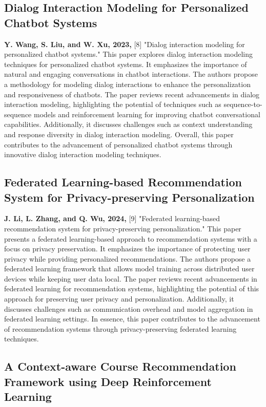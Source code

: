 \subsection{Dialog Interaction Modeling for Personalized Chatbot Systems}

\textbf{Y. Wang, S. Liu, and W. Xu, 2023,} [8] "Dialog interaction modeling for personalized chatbot systems." This paper explores dialog interaction modeling techniques for personalized chatbot systems. It emphasizes the importance of natural and engaging conversations in chatbot interactions. The authors propose a methodology for modeling dialog interactions to enhance the personalization and responsiveness of chatbots. The paper reviews recent advancements in dialog interaction modeling, highlighting the potential of techniques such as sequence-to-sequence models and reinforcement learning for improving chatbot conversational capabilities. Additionally, it discusses challenges such as context understanding and response diversity in dialog interaction modeling. Overall, this paper contributes to the advancement of personalized chatbot systems through innovative dialog interaction modeling techniques.

\subsection{Federated Learning-based Recommendation System for Privacy-preserving Personalization}

\textbf{J. Li, L. Zhang, and Q. Wu, 2024,} [9] "Federated learning-based recommendation system for privacy-preserving personalization." This paper presents a federated learning-based approach to recommendation systems with a focus on privacy preservation. It emphasizes the importance of protecting user privacy while providing personalized recommendations. The authors propose a federated learning framework that allows model training across distributed user devices while keeping user data local. The paper reviews recent advancements in federated learning for recommendation systems, highlighting the potential of this approach for preserving user privacy and personalization. Additionally, it discusses challenges such as communication overhead and model aggregation in federated learning settings. In essence, this paper contributes to the advancement of recommendation systems through privacy-preserving federated learning techniques.

\subsection{A Context-aware Course Recommendation Framework using Deep Reinforcement Learning}

